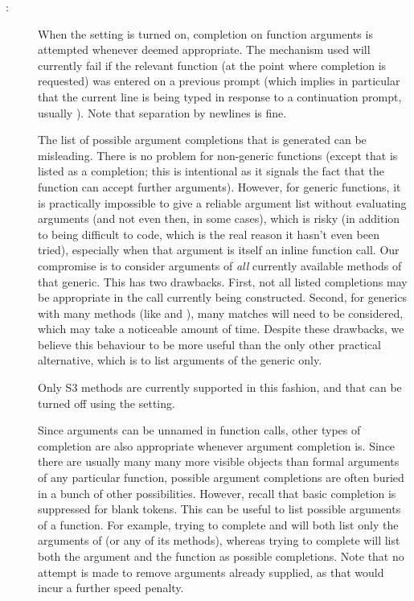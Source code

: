 \begin{Details}
\begin{description}
\item[:] 
When the  setting is turned on, completion on function
arguments is attempted whenever deemed appropriate.  The mechanism
used will currently fail if the relevant function (at the point
where completion is requested) was entered on a previous prompt
(which implies in particular that the current line is being typed
in response to a continuation prompt, usually \code{+}).  Note
that separation by newlines is fine.

The list of possible argument completions that is generated can be
misleading.  There is no problem for non-generic functions (except
that  is listed as a completion; this is intentional
as it signals the fact that the function can accept further
arguments).  However, for generic functions, it is practically
impossible to give a reliable argument list without evaluating
arguments (and not even then, in some cases), which is risky (in
addition to being difficult to code, which is the real reason it
hasn't even been tried), especially when that argument is itself
an inline function call.  Our compromise is to consider arguments
of \emph{all} currently available methods of that generic.  This
has two drawbacks.  First, not all listed completions may be
appropriate in the call currently being constructed.  Second, for
generics with many methods (like  and ),
many matches will need to be considered, which may take a
noticeable amount of time.  Despite these drawbacks, we believe
this behaviour to be more useful than the only other practical
alternative, which is to list arguments of the generic only.

Only S3 methods are currently supported in this fashion, and that
can be turned off using the  setting.

Since arguments can be unnamed in \R{} function calls, other types
of completion are also appropriate whenever argument completion
is.  Since there are usually many many more visible objects than
formal arguments of any particular function, possible argument
completions are often buried in a bunch of other possibilities.
However, recall that basic completion is suppressed for blank
tokens.  This can be useful to list possible arguments of a
function.  For example, trying to complete  and
 will both list only the arguments of
 (or any of its methods), whereas trying to complete
 will list both the 
argument and the  function as possible completions.
Note that no attempt is made to remove arguments already supplied,
as that would incur a further speed penalty.



\end{description}
\end{Details}
